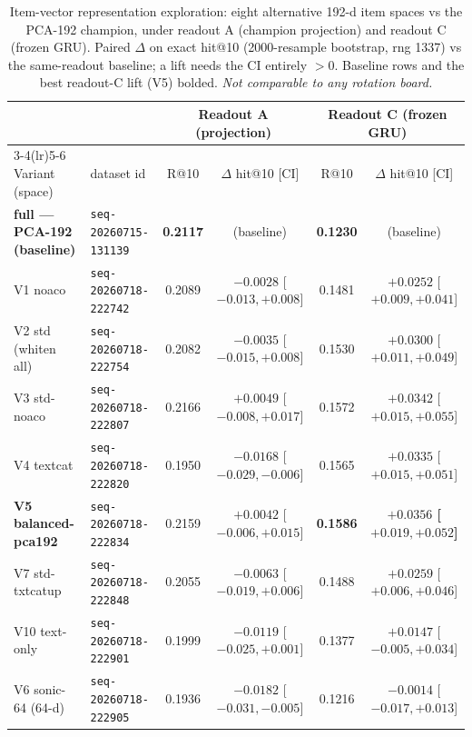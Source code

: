 \documentclass[11pt]{article}
\newcommand{\dsid}[1]{\texttt{\small #1}}
\newcommand{\best}[1]{\textbf{#1}}
\begin{document}
\begin{table}[ht]
  \centering
  \caption{Item-vector representation exploration: eight alternative 192-d item
  spaces vs the PCA-192 champion, under readout A (champion projection) and readout
  C (frozen GRU). Paired $\Delta$ on exact hit@10 (2000-resample bootstrap, rng
  1337) vs the same-readout baseline; a lift needs the CI entirely $>0$. Baseline
  rows and the best readout-C lift (V5) bolded. \emph{Not comparable to any rotation
  board.}}
  \label{tab:nexttrack-representation}
  {\scriptsize\setlength{\tabcolsep}{3pt}\begin{tabular}{llcccc}
    \toprule
    & & \multicolumn{2}{c}{Readout A (projection)} & \multicolumn{2}{c}{Readout C (frozen GRU)} \\
    \cmidrule(lr){3-4}\cmidrule(lr){5-6}
    Variant (space) & dataset id & R@10 & $\Delta$ hit@10 [CI] & R@10 & $\Delta$ hit@10 [CI] \\
    \midrule
    \best{full --- PCA-192 (baseline)} & \dsid{seq-20260715-131139} & \best{0.2117} & (baseline) & \best{0.1230} & (baseline) \\
    V1 noaco               & \dsid{seq-20260718-222742} & 0.2089 & $-0.0028$ [$-0.013,+0.008$] & 0.1481 & $+0.0252$ [$+0.009,+0.041$] \\
    V2 std (whiten all)    & \dsid{seq-20260718-222754} & 0.2082 & $-0.0035$ [$-0.015,+0.008$] & 0.1530 & $+0.0300$ [$+0.011,+0.049$] \\
    V3 std-noaco           & \dsid{seq-20260718-222807} & 0.2166 & $+0.0049$ [$-0.008,+0.017$] & 0.1572 & $+0.0342$ [$+0.015,+0.055$] \\
    V4 textcat             & \dsid{seq-20260718-222820} & 0.1950 & $-0.0168$ [$-0.029,-0.006$] & 0.1565 & $+0.0335$ [$+0.015,+0.051$] \\
    \best{V5 balanced-pca192} & \dsid{seq-20260718-222834} & 0.2159 & $+0.0042$ [$-0.006,+0.015$] & \best{0.1586} & \best{$+0.0356$ [$+0.019,+0.052$]} \\
    V7 std-txtcatup        & \dsid{seq-20260718-222848} & 0.2055 & $-0.0063$ [$-0.019,+0.006$] & 0.1488 & $+0.0259$ [$+0.006,+0.046$] \\
    V10 text-only          & \dsid{seq-20260718-222901} & 0.1999 & $-0.0119$ [$-0.025,+0.001$] & 0.1377 & $+0.0147$ [$-0.005,+0.034$] \\
    V6 sonic-64 (64-d)     & \dsid{seq-20260718-222905} & 0.1936 & $-0.0182$ [$-0.031,-0.005$] & 0.1216 & $-0.0014$ [$-0.017,+0.013$] \\
    \bottomrule
  \end{tabular}}
\end{table}
\end{document}
